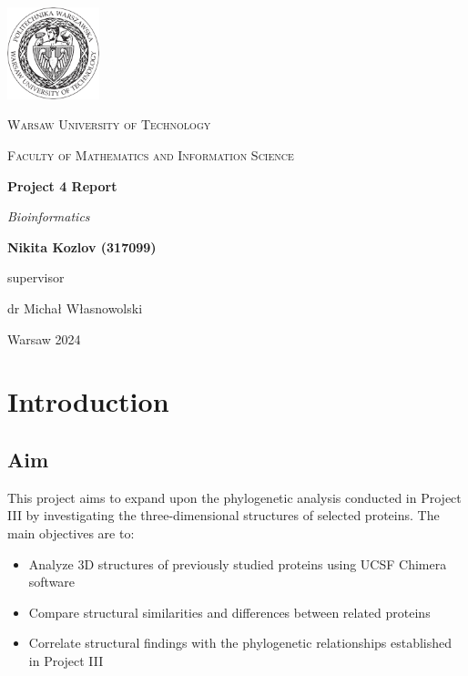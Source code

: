 \documentclass[11pt, a4paper, hidelinks]{article}
\begin{document}
\begin{titlepage}
    \centering
    \vspace*{0.5 cm}
    \includegraphics[width=0.20\textwidth]{logo.png}\par\vspace{1cm}
    {\scshape\LARGE Warsaw University of Technology \par}
    \vspace{1cm}
    {\scshape\Large Faculty of Mathematics and Information Science\par}
    \vspace{1.5cm}
    {\huge\bfseries Project 4 Report\par}
    \vspace{1cm}
    {\Large\itshape Bioinformatics\par}
    \vfill
    \begin{flushright}

    {\Large\bfseries Nikita Kozlov (317099)\par}
    \vfill
    {supervisor\par}
    {\Large dr Michał Własnowolski \par}

    \end{flushright}
    \vfill
    {\large Warsaw 2024\par}
    \vspace{1cm}
\end{titlepage}

\tableofcontents

\newpage

\section{Introduction}\label{sec:introduction}

\subsection{Aim}\label{subsec:aim}
This project aims to expand upon the phylogenetic analysis conducted in Project III by investigating the three-dimensional structures of selected proteins. The main objectives are to:
\begin{itemize}
    \item Analyze 3D structures of previously studied proteins using UCSF Chimera software
    \item Compare structural similarities and differences between related proteins
    \item Correlate structural findings with the phylogenetic relationships established in Project III
\end{itemize}
\end{document}
